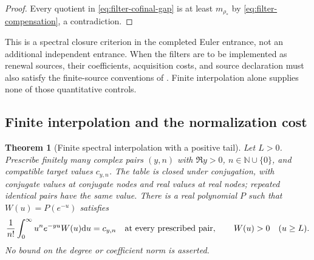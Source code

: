 \documentclass[11pt]{article}
\newtheorem{theorem}{Theorem}[section]
\theoremstyle{definition}
\theoremstyle{remark}
\newcommand{\N}{\mathbb N}
\newcommand{\dd}{\mathrm d}
\begin{document}
\begin{proof}
Every quotient in \eqref{eq:filter-cofinal-gap} is at least
$m_{\rho_*}$ by \eqref{eq:filter-compensation}, a contradiction.
\end{proof}

This is a spectral closure criterion in the completed Euler entrance,
not an additional independent entrance.  When the filters are to be
implemented as renewal sources, their coefficients, acquisition costs,
and source declaration must also satisfy the finite-source conventions
of .  Finite interpolation
alone supplies none of those quantitative controls.

\subsection{Finite interpolation and the normalization cost}
\label{subsec:filter-interpolation-cost}

\begin{theorem}[Finite spectral interpolation with a positive tail]
\label{thm:filter-tail-interpolation}
Let $L>0$.  Prescribe finitely many complex pairs $(y,n)$ with
$\Re y>0$, $n\in\N\cup\{0\}$, and compatible target values
$c_{y,n}$.  The table is closed under conjugation, with conjugate values
at conjugate nodes and real values at real nodes; repeated identical
pairs have the same value.  There is a real polynomial $P$ such that
$W(u)=P(e^{-u})$ satisfies
\begin{equation}
 \frac1{n!}\int_0^\infty u^ne^{-yu}W(u)\dd u=c_{y,n}
 \quad\hbox{at every prescribed pair},\qquad
 W(u)>0\quad(u\ge L).
 \label{eq:filter-tail-interpolation}
\end{equation}
No bound on the degree or coefficient norm is asserted.
\end{theorem}
\end{document}
